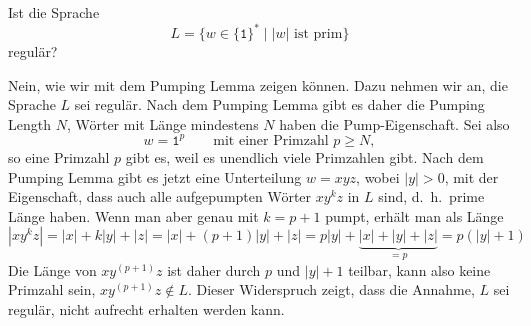 Ist die Sprache
\[
L=\{w\in\{\texttt{1}\}^*\mid\text{$|w|$ ist prim}\}
\]
regulär?


\begin{loesung}
Nein, wie wir mit dem Pumping Lemma zeigen können.
Dazu nehmen wir an, die Sprache $L$ sei regulär.
Nach dem Pumping Lemma gibt es daher die Pumping Length $N$, Wörter
mit Länge mindestens $N$ haben die Pump-Eigenschaft.
Sei also 
\[
w=\texttt{1}^p\qquad\text{mit einer Primzahl $p\ge N$},
\]
so eine Primzahl $p$ gibt es, weil es unendlich viele Primzahlen gibt.
Nach dem Pumping Lemma gibt es jetzt eine Unterteilung $w=xyz$, wobei
$|y|>0$, mit der Eigenschaft, dass auch alle aufgepumpten Wörter
$xy^kz$ in $L$ sind, d.~h.~prime Länge haben.
Wenn man aber genau mit $k=p+1$ pumpt, erhält man als Länge
\[
|xy^kz|
=
|x| + k|y| + |z|
=
|x| + (p+1)|y| + |z|
=
p|y| + \underbrace{|x|+|y|+|z|}_{\textstyle=p}
=
p(|y|+1)
\]
Die Länge von $xy^{(p+1)}z$ ist daher durch $p$ und $|y|+1$ teilbar, kann also
keine Primzahl sein, $xy^{(p+1)}z\not\in L$.
Dieser Widerspruch zeigt, dass die Annahme, $L$ sei regulär, nicht
aufrecht erhalten werden kann.
\end{loesung}


